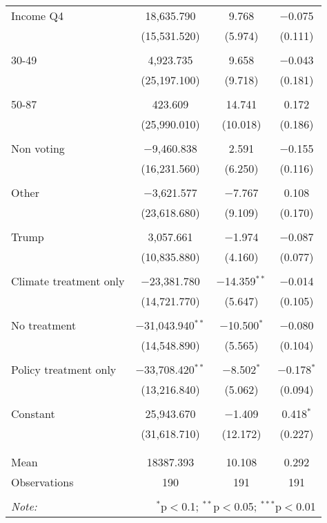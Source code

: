 \begin{tabular}{@{\extracolsep{5pt}}lccc}
 Income Q4 & 18,635.790 & 9.768 & $-$0.075 \\ 
  & (15,531.520) & (5.974) & (0.111) \\ 
  & & & \\ 
 30-49 & 4,923.735 & 9.658 & $-$0.043 \\ 
  & (25,197.100) & (9.718) & (0.181) \\ 
  & & & \\ 
 50-87 & 423.609 & 14.741 & 0.172 \\ 
  & (25,990.010) & (10.018) & (0.186) \\ 
  & & & \\ 
 Non voting & $-$9,460.838 & 2.591 & $-$0.155 \\ 
  & (16,231.560) & (6.250) & (0.116) \\ 
  & & & \\ 
 Other & $-$3,621.577 & $-$7.767 & 0.108 \\ 
  & (23,618.680) & (9.109) & (0.170) \\ 
  & & & \\ 
 Trump & 3,057.661 & $-$1.974 & $-$0.087 \\ 
  & (10,835.880) & (4.160) & (0.077) \\ 
  & & & \\ 
 Climate treatment only & $-$23,381.780 & $-$14.359$^{**}$ & $-$0.014 \\ 
  & (14,721.770) & (5.647) & (0.105) \\ 
  & & & \\ 
 No treatment & $-$31,043.940$^{**}$ & $-$10.500$^{*}$ & $-$0.080 \\ 
  & (14,548.890) & (5.565) & (0.104) \\ 
  & & & \\ 
 Policy treatment only & $-$33,708.420$^{**}$ & $-$8.502$^{*}$ & $-$0.178$^{*}$ \\ 
  & (13,216.840) & (5.062) & (0.094) \\ 
  & & & \\ 
 Constant & 25,943.670 & $-$1.409 & 0.418$^{*}$ \\ 
  & (31,618.710) & (12.172) & (0.227) \\ 
  & & & \\ 
\hline \\[-1.8ex] 
Mean & 18387.393 & 10.108 & 0.292 \\ 
Observations & 190 & 191 & 191 \\ 
\hline 
\hline \\[-1.8ex] 
\textit{Note:}  & \multicolumn{3}{r}{$^{*}$p$<$0.1; $^{**}$p$<$0.05; $^{***}$p$<$0.01} \\ 
\end{tabular} 
